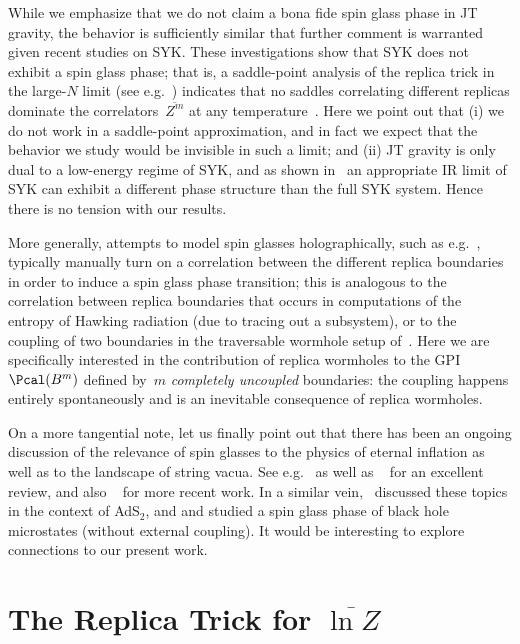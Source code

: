 \documentclass[12pt]{article}
\begin{document}
While we emphasize that we do not claim a bona fide spin glass phase in JT gravity, the behavior is sufficiently similar that further comment is warranted given recent studies on SYK.  These investigations show that SYK does not exhibit a spin glass phase; that is, a saddle-point analysis of the replica trick in the large-$N$ limit (see e.g.~\cite{BagAlt16,KitSuh17}) indicates that no saddles correlating different replicas dominate the correlators~$\overline{Z^m}$ at any temperature~\cite{MalSta16,GarVer16,BagAlt16,CotGur16,GurMah18,AreKhr18,CarCar18,Ye18,GeoPar01,FuSac16}.  Here we point out that (i) we do not work in a saddle-point approximation, and in fact we expect that the behavior we study would be invisible in such a limit; and (ii) JT gravity is only dual to a low-energy regime of SYK, and as shown in~\cite{AreKhr18} an appropriate IR limit of SYK can exhibit a different phase structure than the full SYK system.  Hence there is no tension with our results.

More generally, attempts to model spin glasses holographically, such as e.g.~\cite{FujHik08, AhaKom15}, typically manually turn on a correlation between the different replica boundaries in order to induce a spin glass phase transition; this is analogous to the correlation between replica boundaries that occurs in computations of the entropy of Hawking radiation (due to tracing out a subsystem), or to the coupling of two boundaries in the traversable wormhole setup of~\cite{GaoJaf16, MalQi18}.  Here we are specifically interested in the contribution of replica wormholes to the GPI~$\Pcal(B^m)$ defined by~$m$ \textit{completely uncoupled} boundaries: the coupling happens entirely spontaneously and is an inevitable consequence of replica wormholes.
 
On a more tangential note, let us finally point out that there has been an ongoing discussion of the relevance of spin glasses to the physics of eternal inflation as well as to the landscape of string vacua. See e.g.~\cite{AnnDen11} as well as ~\cite{DenTASI} for an excellent review, and also ~\cite{JaiVan15} for more recent work. In a similar vein,~\cite{AnnAno13b} discussed these topics in the context of AdS$_{2}$, and \cite{AnnAno11} and \cite{AnnAno13a} studied a spin glass phase of black hole microstates (without external coupling).  It would be interesting to explore connections to our present work.



\section{The Replica Trick for $\overline{\ln Z}$}
\label{sec:replicatrick}
\end{document}
